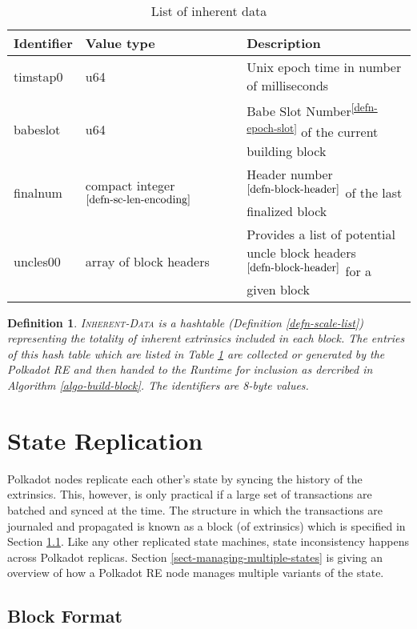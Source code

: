 \documentclass{book}
\newcommand{\tmname}[1]{\textsc{#1}}
\newcommand{\tmrsup}[1]{\textsuperscript{#1}}
\newcommand{\tmtextsc}[1]{{\scshape{#1}}}
\newtheorem{definition}{Definition}
\providecommand{\tmname}[1]{\tmtextsc{#1}}
\newtheorem{definition}{Definition}
\begin{document}
\begin{table}[h]
  \begin{tabular}{lll}
    \hline
    Identifier & Value type  & Description\\
    \hline
    timstap0 & u64 & Unix epoch time in number of milliseconds\\
    babeslot & u64 & Babe Slot Number\tmrsup{\ref{defn-epoch-slot}} of the
    current building block\\
    finalnum & compact integer$^{\ref{defn-sc-len-encoding}}$ & Header
    number$^{\ref{defn-block-header}}$ of the last finalized block\\
    uncles00 & array of block headers$^{}$ & Provides a list of potential
    uncle block headers$^{\ref{defn-block-header}}$ for a given block\\
    \hline
  \end{tabular}
  \caption{\label{tabl-inherent-data}List of inherent data}
\end{table}

\begin{definition}
  \label{defn-inherent-data}{\tmname{Inherent-Data }}is a hashtable
  (Definition \ref{defn-scale-list}) representing the totality of inherent
  extrinsics included in each block. The entries of this hash table which are
  listed in Table \ref{tabl-inherent-data} are collected or generated by the
  Polkadot RE and then handed to the Runtime for inclusion as dercribed in
  Algorithm \ref{algo-build-block}. The identifiers are 8-byte values.
\end{definition}

\section{State Replication}\label{sect-state-replication}

Polkadot nodes replicate each other's state by syncing the history of the
extrinsics. This, however, is only practical if a large set of transactions
are batched and synced at the time. The structure in which the transactions
are journaled and propagated is known as a block (of extrinsics) which is
specified in Section \ref{sect-block-format}. Like any other replicated state
machines, state inconsistency happens across Polkadot replicas. Section
\ref{sect-managing-multiple-states} is giving an overview of how a Polkadot RE
node manages multiple variants of the state.

\subsection{Block Format}\label{sect-block-format}
\end{document}
